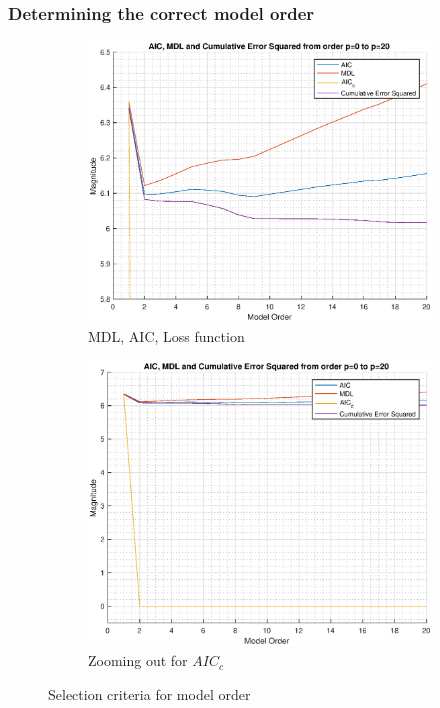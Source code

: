 \documentclass{article}
\begin{document}
\subsubsection{Determining the correct model order}

\begin{figure}[h!]
\centering
\begin{subfigure}{0.32\textwidth}
\centering
\includegraphics[width = \textwidth]{mdl_aic_zoom}
\caption{MDL, AIC, Loss function}
\label{fig:mdl_aic_zoom}
\end{subfigure}
\begin{subfigure}{0.32\textwidth}
\centering
\includegraphics[width = \textwidth]{mdl_aic}
\caption{Zooming out for $AIC_c$}
\label{fig:mdl_aic}
\end{subfigure}
\caption{Selection criteria for model order}
\label{yule_pcf}
\end{figure}
\end{document}
